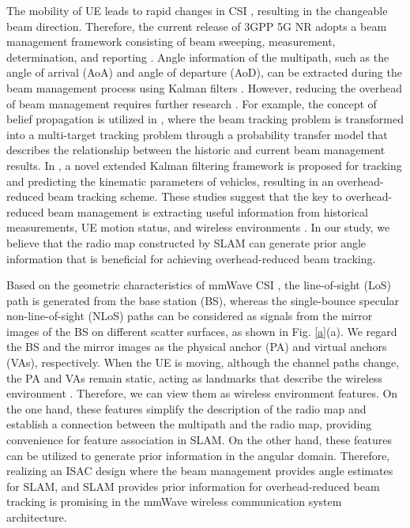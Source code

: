 \documentclass[journal,12pt,onecolumn,draftclsnofoot,]{IEEEtran}
\begin{document}
The mobility of UE leads to rapid changes in CSI \cite{a902}, resulting in the changeable beam direction. Therefore, the current release of 3GPP 5G NR adopts a beam management framework consisting of beam sweeping, measurement, determination, and reporting \cite{a10}. 
{\color{black}Angle information of the multipath, such as the angle of arrival (AoA) and angle of departure (AoD), can be extracted during the beam management process using Kalman filters \cite{a1001,a100101}.} %
However, reducing the overhead of beam management requires further research \cite{a1003}. For example, the concept of belief propagation is utilized in \cite{a11}, where the beam tracking problem is transformed into a multi-target tracking problem through a probability transfer model that describes the relationship between the historic and current beam management results. 
In \cite{a1101}, a novel extended Kalman filtering framework is proposed for tracking and predicting the kinematic parameters of vehicles, resulting in an overhead-reduced beam tracking scheme. These studies suggest that the key to overhead-reduced beam management is extracting useful information from historical measurements, UE motion status, and wireless environments \cite{a11,a1101,a11011}. 
In our study, we believe that the radio map constructed by SLAM can generate prior angle information that is beneficial for achieving overhead-reduced beam tracking. 

Based on the geometric characteristics of mmWave CSI \cite{a901}, the line-of-sight (LoS) path is generated from the base station (BS), whereas the single-bounce specular non-line-of-sight (NLoS) paths can be considered as signals from the mirror images of the BS on different scatter surfaces, as shown in Fig. \ref{a}(a). We regard the BS and the mirror images as the physical anchor (PA) and virtual anchors (VAs), respectively. When the UE is moving, although the channel paths change, the PA and VAs remain static, acting as landmarks that describe the wireless environment \cite{a6,a1102,a1103,a1104,a1105}. Therefore, we can view them as wireless environment features. 
On the one hand, these features simplify the description of the radio map and establish a connection between the multipath and the radio map, providing convenience for feature association in SLAM. On the other hand, these features can be utilized to generate prior information in the angular domain.
Therefore, realizing an ISAC design where the beam management provides angle estimates for SLAM, and SLAM provides prior information for overhead-reduced beam tracking is promising in the mmWave wireless communication system architecture.
\end{document}
